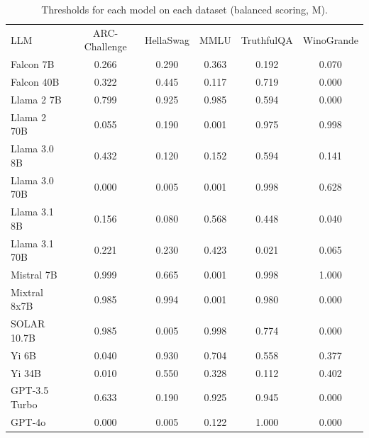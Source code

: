 \begin{table}[h]
\caption{Thresholds for each model on each dataset (balanced scoring, M). }
\label{tab:thresholds_prob_margin_k20_w1}
\centering
\begin{tabular}{l S[table-format=3.1] S[table-format=3.1] S[table-format=3.1] S[table-format=3.1] S[table-format=3.1]}
\toprule
LLM & ARC-Challenge & HellaSwag & MMLU & TruthfulQA & WinoGrande \\ 
\cmidrule(lr){1-1} \cmidrule(lr){2-2} \cmidrule(lr){3-3} \cmidrule(lr){4-4} \cmidrule(lr){5-5} \cmidrule(lr){6-6}
Falcon 7B & 0.266 & 0.290 & 0.363 & 0.192 & 0.070\\
Falcon 40B & 0.322 & 0.445 & 0.117 & 0.719 & 0.000\\
Llama 2 7B & 0.799 & 0.925 & 0.985 & 0.594 & 0.000\\
Llama 2 70B & 0.055 & 0.190 & 0.001 & 0.975 & 0.998\\
Llama 3.0 8B & 0.432 & 0.120 & 0.152 & 0.594 & 0.141\\
Llama 3.0 70B & 0.000 & 0.005 & 0.001 & 0.998 & 0.628\\
Llama 3.1 8B & 0.156 & 0.080 & 0.568 & 0.448 & 0.040\\
Llama 3.1 70B & 0.221 & 0.230 & 0.423 & 0.021 & 0.065\\
Mistral 7B & 0.999 & 0.665 & 0.001 & 0.998 & 1.000\\
Mixtral 8x7B & 0.985 & 0.994 & 0.001 & 0.980 & 0.000\\
SOLAR 10.7B & 0.985 & 0.005 & 0.998 & 0.774 & 0.000\\
Yi 6B & 0.040 & 0.930 & 0.704 & 0.558 & 0.377\\
Yi 34B & 0.010 & 0.550 & 0.328 & 0.112 & 0.402\\
GPT-3.5 Turbo & 0.633 & 0.190 & 0.925 & 0.945 & 0.000\\
GPT-4o & 0.000 & 0.005 & 0.122 & 1.000 & 0.000\\
\bottomrule
\end{tabular}
\end{table}
